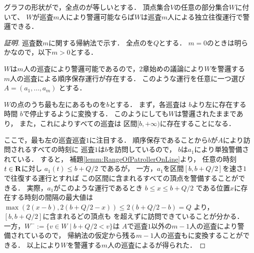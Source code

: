\begin{lemm}
\label{lemm:LineEqualTimelimitIndependentInterval}
グラフの形状が{\graphLine}で，全点の{\maxIdletime}が等しいとする．
頂点集合$V$の任意の部分集合$W$に付いて、
$W$が巡査$m$人により警邏可能ならば$W$は巡査$m$人による独立往復運行で警邏できる．
\end{lemm}
\begin{proof}[証明]
\newcommand{\leftmostpoint}{b}  %
\newcommand{\newpatroller}{l}
\newcommand{\leftmostpatroller}{巡査1}
\newcommand{\leftmostpatOpr}{a_1}

巡査数$m$に関する帰納法で示す．
全点の{\maxIdletime}を$Q$とする．
$m = 0$のときは明らかなので，以下$m > 0$とする．

$W$は$m$人の巡査により警邏可能であるので，2章始めの議論により$W$を警邏する$m$人の巡査による順序保存運行が存在する．
このような運行を任意に一つ選び
$A = (a _1, \ldots, a _m)$
とする．

$W$の点のうち最も左にあるものを$\leftmostpoint$とする．
まず，各巡査は
$\leftmostpoint$より左に存在する時間
$\leftmostpoint$で停止するように変換する．
このようにしても$W$は警邏されたままであり，
また，これによりすべての巡査は
区間$[\leftmostpoint, +\infty)$に存在することになる．

ここで，最も左の巡査$\leftmostpatroller$に注目する．
順序保存であることから$\leftmostpoint$が$A$により訪問されるすべての時刻に
$\leftmostpatroller$は$\leftmostpoint$を訪問しているので，
$\leftmostpoint$は$\leftmostpatOpr$により単独警備されている．
%
すると，
補題\ref{lemm:RangeOfPatrollerOnLine}より，
任意の時刻$t \in \mathbf R$に対し
$\leftmostpatOpr(t) \leq \leftmostpoint + Q/2$
であるが，
%
一方，$\leftmostpatOpr$を区間$[b, b + Q/2]$を速さ$1$で往復する運行とすれば
この区間に含まれるすべての頂点を警備することができる．
実際，$\leftmostpatOpr$がこのような運行であるとき
$\leftmostpoint \leq x \leq \leftmostpoint + Q/2$
である位置$x$に存在する時刻の間隔の最大値は
$ \max( 2(x - \leftmostpoint), 2(\leftmostpoint + Q/2 - x) )
  \leq 2(\leftmostpoint + Q/2 - \leftmostpoint) = Q $
より，$[\leftmostpoint, \leftmostpoint + Q/2]$に含まれるどの頂点も
{\maxIdletime}を超えずに訪問できていることが分かる．
%
一方，$W^- := \{ v \in W \mid \leftmostpoint + Q/2 < v \}$は
$A$で$\leftmostpatroller$以外の$m - 1$人の巡査により警備されているので，
帰納法の仮定から残る$m - 1$人の巡査も{\indSectOperation}に変換することができる．
以上により$W$を警邏する$m$人の巡査による{\indSectOperation}が得られた．
\end{proof}


